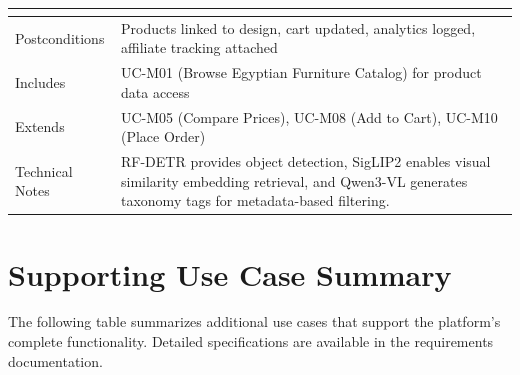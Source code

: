 \begin{table}[h]
\begin{tabular}{p{3cm}p{11cm}}
\begin{itemize}[leftmargin=*,noitemsep,topsep=0pt]
\end{itemize} \\
\midrule
Postconditions & Products linked to design, cart updated, analytics logged, affiliate tracking attached \\
\midrule
Includes & UC-M01 (Browse Egyptian Furniture Catalog) for product data access \\
\midrule
Extends & UC-M05 (Compare Prices), UC-M08 (Add to Cart), UC-M10 (Place Order) \\
\midrule
Technical Notes & 
RF-DETR provides object detection, SigLIP2 enables visual similarity embedding retrieval, and Qwen3-VL generates taxonomy tags for metadata-based filtering. \\
\bottomrule
\end{tabular}
\end{table}

\clearpage

\section{Supporting Use Case Summary}
\label{sec:app_supporting_uc}

The following table summarizes additional use cases that support the platform's complete functionality. Detailed specifications are available in the requirements documentation.

